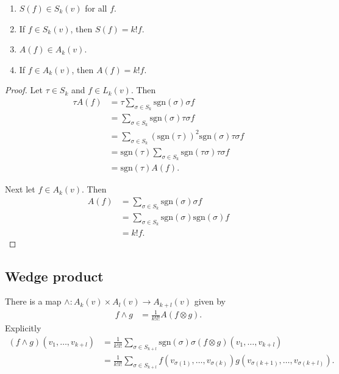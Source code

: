 \begin{lemma}
  \begin{enumerate}
    \item{
      $S(f) \in S_k(v)$ for all $f$.
    }
    \item{
      If $f \in S_k(v)$, then $S(f) = k! f$.
    }
    \item{
      $A(f) \in A_k(v)$.
    }
    \item{
      If $f \in A_k(v)$, then $A(f) = k! f$.
    }
  \end{enumerate}
\end{lemma}

\begin{proof}
Let $\tau \in S_k$ and $f \in L_k(v)$. Then
\begin{align*}
   \tau A(f)
&= \tau
     \sum_{\sigma \in S_k}
       \mathrm{sgn}(\sigma)
       \sigma f \\
&= \sum_{\sigma \in S_k}
     \mathrm{sgn}(\sigma)
     \tau \sigma f \\
&= \sum_{\sigma \in S_k}
     (\mathrm{sgn}(\tau))^2
     \mathrm{sgn}(\sigma)
     \tau \sigma f \\
&= \mathrm{sgn}(\tau)
   \sum_{\sigma \in S_k}
     \mathrm{sgn}(\tau \sigma)
     \tau \sigma f \\
&= \mathrm{sgn}(\tau) A(f).
\end{align*}

Next let $f \in A_k(v)$. Then
\begin{align*}
   A(f)
&= \sum_{\sigma \in S_k}
     \mathrm{sgn}(\sigma)
     \sigma f \\
&= \sum_{\sigma \in S_k}
     \mathrm{sgn}(\sigma)
     \mathrm{sgn}(\sigma)
     f \\
&= k! f.
\end{align*}
\end{proof}

\subsection{Wedge product}
There is a map
$\wedge : A_k(v) \times A_l(v) \to A_{k + l}(v)$
given by
\begin{align*}
   f \wedge g
&= \frac{1}{k! l!}
     A(f \otimes g).
\end{align*}
Explicitly
\begin{align*}
   (f \wedge g)(v_1, \dots, v_{k+l})
&= \frac{1}{k! l!}
     \sum_{\sigma \in S_{k+l}}
       \mathrm{sgn}(\sigma)
       \sigma(f \otimes g)
         (v_1, \dots, v_{k+l}) \\
&= \frac{1}{k! l!}
     \sum_{\sigma \in S_{k+l}}
       f(v_{\sigma(1)}, \dots, v_{\sigma(k)})
       g(v_{\sigma(k+1)}, \dots, v_{\sigma(k+l)}).
\end{align*}

